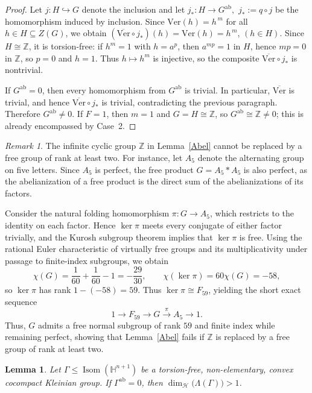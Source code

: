 \documentclass[12pt,oneside,a4paper]{article}
\theoremstyle{mytheorem}
\newtheorem{lemma}[definition]{Lemma}
\theoremstyle{remark}
\newtheorem{remark}[definition]{Remark}
\theoremstyle{definition}
\begin{document}
\begin{proof}
Let $j:H\hookrightarrow G$ denote the inclusion and let
$j_*:H\to G^{\mathrm{ab}},$ $j_*:=q\circ j$ be the
homomorphism induced by inclusion. Since  $\mathrm{Ver}(h)=h^{\,m}$ for all
$h\in H\subseteq Z(G)$, we obtain
$(\overline{\mathrm{Ver}}\circ j_*)(h)=\mathrm{Ver}(h)=h^{\,m}$, $(h\in H).$
Since $H\cong\mathbb Z$, it is torsion-free: if $h^m=1$ with $h=a^p$, then $a^{mp}=1$ in $H$, hence $mp=0$ in $\mathbb Z$, so $p=0$ and $h=1$. Thus $h\mapsto h^m$ is injective, so the composite $\overline{\mathrm{Ver}}\circ j_*$ is nontrivial.


If $G^{\mathrm{ab}}=0$, then every homomorphism from $G^{\mathrm{ab}}$ is trivial. In particular, $\overline{\mathrm{Ver}}$ is trivial, and hence
$\overline{\mathrm{Ver}}\circ j_*$ is trivial, contradicting the previous paragraph. Therefore $G^{\mathrm{ab}}\neq0$. If $F=1$, then $m=1$ and $G=H\cong\mathbb Z$, so $G^{\mathrm{ab}}\cong\mathbb Z\neq0$; this is already encompassed by Case~2.
\end{proof}




\begin{remark}\label{free}
The infinite cyclic group \( \mathbb{Z} \) in Lemma~\ref{Abel} cannot be replaced by a free group of rank at least two. For instance, let \( A_5 \) denote the alternating group on five letters. Since \( A_5 \) is perfect, the free product \( G = A_5 \ast A_5 \) is also perfect, as the abelianization of a free product is the direct sum of the abelianizations of its factors.

Consider the natural folding homomorphism \( \pi: G \to A_5 \), which restricts to the identity on each factor. Hence $\ker\pi$ meets every conjugate of either factor trivially, and the Kurosh subgroup theorem implies that $\ker\pi$ is free. Using the rational Euler characteristic of virtually free groups and its multiplicativity under passage to finite-index subgroups, we obtain
\[
\chi(G)=\frac1{60}+\frac1{60}-1=-\frac{29}{30},
\qquad
\chi(\ker\pi)=60\chi(G)=-58,
\]
so \(\ker\pi\) has rank \(1-(-58)=59\). Thus $\ker\pi\cong F_{59}$, yielding the short exact sequence
\[
1 \longrightarrow F_{59} \longrightarrow G \xrightarrow{\pi} A_5 \longrightarrow 1.
\]
Thus, $G$ admits a free normal subgroup of rank $59$ and finite index while remaining perfect, showing that Lemma~\ref{Abel} fails if $\mathbb{Z}$ is replaced by a free group of rank at least two.
\end{remark}


\begin{lemma}\label{lem:strict-lower}
Let $\Gamma\leq\operatorname{Isom}(\mathbb H^{n+1})$ be a torsion-free,
non-elementary, convex cocompact Kleinian group. If
$\Gamma^{\mathrm{ab}}=0$, then
$\dim_{\mathcal H}\!\bigl(\Lambda(\Gamma)\bigr)>1$.
\end{lemma}
\end{document}
